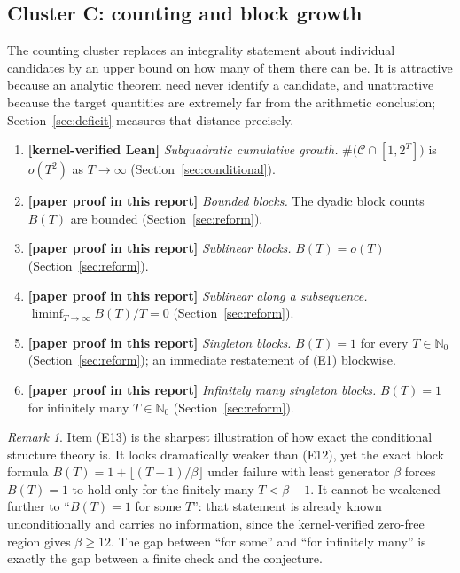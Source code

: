 \documentclass[11pt,oneside]{article}
\theoremstyle{definition}
\theoremstyle{remark}
\newtheorem{remark}[theorem]{Remark}
\newcommand{\Nzero}{\mathbb N_0}
\newcommand{\Cand}{\mathcal C}
\newcommand{\statuslean}{\textcolor{leanblue}{\textbf{[kernel-verified Lean]}}}
\newcommand{\statusnew}{\textcolor{newgreen}{\textbf{[paper proof in this report]}}}
\begin{document}
\subsection{Cluster C: counting and block growth}

The counting cluster replaces an integrality statement about individual candidates by an upper
bound on how many of them there can be.  It is attractive because an analytic theorem need
never identify a candidate, and unattractive because the target quantities are extremely far
from the arithmetic conclusion; Section~\ref{sec:deficit} measures that distance precisely.

\begin{enumerate}[resume,label=\textup{(E\arabic*)}]
\item \statuslean{} \emph{Subquadratic cumulative growth.} $\#\bigl(\Cand\cap[1,2^T]\bigr)$ is
$o(T^2)$ as $T\to\infty$ (Section~\ref{sec:conditional}).
\item \statusnew{} \emph{Bounded blocks.} The dyadic block counts $B(T)$ are bounded
(Section~\ref{sec:reform}).
\item \statusnew{} \emph{Sublinear blocks.} $B(T)=o(T)$ (Section~\ref{sec:reform}).
\item \statusnew{} \emph{Sublinear along a subsequence.} $\liminf_{T\to\infty}B(T)/T=0$
(Section~\ref{sec:reform}).
\item \statusnew{} \emph{Singleton blocks.} $B(T)=1$ for every $T\in\Nzero$
(Section~\ref{sec:reform}); an immediate restatement of (E1) blockwise.
\item \statusnew{} \emph{Infinitely many singleton blocks.} $B(T)=1$ for infinitely many
$T\in\Nzero$ (Section~\ref{sec:reform}).
\end{enumerate}

\begin{remark}
\label{eq:rem-infinitely-many}
Item (E13) is the sharpest illustration of how exact the conditional structure theory is.  It
looks dramatically weaker than (E12), yet the exact block formula
$B(T)=1+\lfloor(T+1)/\beta\rfloor$ under failure with least generator $\beta$ forces $B(T)=1$
to hold only for the finitely many $T<\beta-1$.  It cannot be weakened further to ``$B(T)=1$
for some $T$'': that statement is already known unconditionally and carries no information,
since the kernel-verified zero-free region gives $\beta\ge12$.  The gap between ``for some''
and ``for infinitely many'' is exactly the gap between a finite check and the conjecture.
\end{remark}
\end{document}
